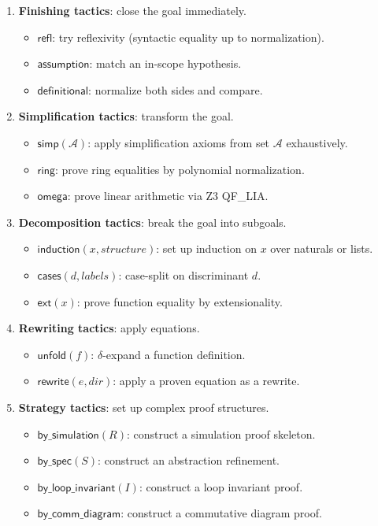 \begin{enumerate}
\item \textbf{Finishing tactics}: close the goal immediately.
  \begin{itemize}
  \item $\mathsf{refl}$: try reflexivity (syntactic equality up to
    normalization).
  \item $\mathsf{assumption}$: match an in-scope hypothesis.
  \item $\mathsf{definitional}$: normalize both sides and compare.
  \end{itemize}

\item \textbf{Simplification tactics}: transform the goal.
  \begin{itemize}
  \item $\mathsf{simp}(\mathcal{A})$: apply simplification axioms from
    set $\mathcal{A}$ exhaustively.
  \item $\mathsf{ring}$: prove ring equalities by polynomial
    normalization.
  \item $\mathsf{omega}$: prove linear arithmetic via Z3 QF\_LIA.
  \end{itemize}

\item \textbf{Decomposition tactics}: break the goal into subgoals.
  \begin{itemize}
  \item $\mathsf{induction}(x, \mathit{structure})$: set up induction on
    $x$ over naturals or lists.
  \item $\mathsf{cases}(d, \mathit{labels})$: case-split on discriminant $d$.
  \item $\mathsf{ext}(x)$: prove function equality by extensionality.
  \end{itemize}

\item \textbf{Rewriting tactics}: apply equations.
  \begin{itemize}
  \item $\mathsf{unfold}(f)$: $\delta$-expand a function definition.
  \item $\mathsf{rewrite}(e, \mathit{dir})$: apply a proven equation
    as a rewrite.
  \end{itemize}

\item \textbf{Strategy tactics}: set up complex proof structures.
  \begin{itemize}
  \item $\mathsf{by\_simulation}(R)$: construct a simulation proof skeleton.
  \item $\mathsf{by\_spec}(S)$: construct an abstraction refinement.
  \item $\mathsf{by\_loop\_invariant}(I)$: construct a loop invariant proof.
  \item $\mathsf{by\_comm\_diagram}$: construct a commutative diagram proof.
  \end{itemize}


\end{enumerate}
